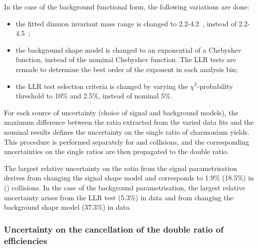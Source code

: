 In the case of the background functional form, the following variations are done:
\begin{itemize}
 \item the fitted dimuon invariant mass range is changed to 2.2-4.2~\GeVcc, instead of 2.2-4.5~\GeVcc;
 \item the background shape model is changed to an exponential of a Chebyshev function, instead of the nominal Chebyshev function. The LLR tests are remade to determine the best order of the exponent in each analysis bin;
 \item the LLR test selection criteria is changed by varying the $\chi^{2}$-probability threshold to 10\% and 2.5\%, instead of nominal 5\%.
\end{itemize}

For each source of uncertainty (choice of signal and background models), the maximum difference between the \singleRatio ratio extracted from the varied data fits and the nominal results defines the uncertainty on the single ratio of charmonium yields. This procedure is performed separately for \Runpp and \RunPbPb collisions, and the corresponding uncertainties on the single ratios are then propagated to the double ratio.

The largest relative uncertainty on the \singleRatio ratio from the signal parametrisation derives from changing the signal shape model and corresponds to 1.9\% (18.5\%) in \Runpp (\RunPbPb) collisions. In the case of the background parametrisation, the largest relative uncertainty arises from the LLR test (5.3\%) in \Runpp data and from changing the background shape model (37.3\%) in \RunPbPb data.


\subsubsection{Uncertainty on the cancellation of the double ratio of efficiencies}\label{sec:Charmonia_Analysis_PsiPoverJPsiRatioSystematics_Effiency}

